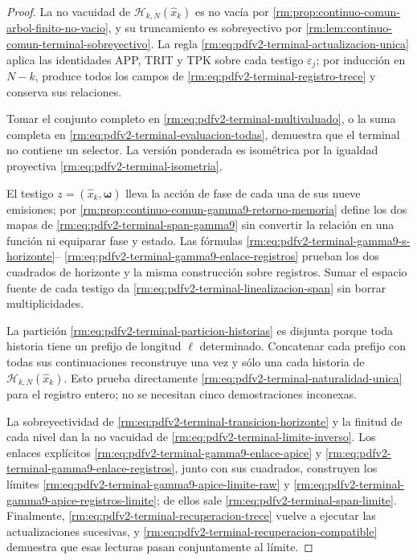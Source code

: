 \begin{proof}
La no vacuidad de
\(\mathscr H_{k,N}(\widehat x_k)\) es no vac\'ia por
\cref{rm:prop:continuo-comun-arbol-finito-no-vacio}, y su truncamiento es
sobreyectivo por \cref{rm:lem:continuo-comun-terminal-sobreyectivo}. La regla
\eqref{rm:eq:pdfv2-terminal-actualizacion-unica} aplica las identidades APP,
TRIT y TPK sobre cada testigo \(\varepsilon_j\); por inducci\'on en
\(N-k\), produce todos los campos de
\eqref{rm:eq:pdfv2-terminal-registro-trece} y conserva sus relaciones.

Tomar el conjunto completo en
\eqref{rm:eq:pdfv2-terminal-multivaluado}, o la suma completa en
\eqref{rm:eq:pdfv2-terminal-evaluacion-todas}, demuestra que el terminal no
contiene un selector. La versi\'on ponderada es isom\'etrica por la igualdad
proyectiva \eqref{rm:eq:pdfv2-terminal-isometria}.

El testigo \(z=(\widehat x_k,\boldsymbol\omega)\) lleva la acción de fase de cada una
de sus nueve emisiones; por
\cref{rm:prop:continuo-comun-gamma9-retorno-memoria} define los dos mapas de
\eqref{rm:eq:pdfv2-terminal-span-gamma9} sin convertir la relación en una
función ni equiparar fase y estado. Las fórmulas
\eqref{rm:eq:pdfv2-terminal-gamma9-s-horizonte}--
\eqref{rm:eq:pdfv2-terminal-gamma9-enlace-registros} prueban los dos cuadrados
de horizonte y la misma construcción sobre registros. Sumar el espacio
fuente de cada testigo da
\eqref{rm:eq:pdfv2-terminal-linealizacion-span} sin borrar multiplicidades.

La partici\'on
\eqref{rm:eq:pdfv2-terminal-particion-historias} es disjunta porque toda
historia tiene un prefijo de longitud \(\ell\) determinado. Concatenar cada
prefijo con todas sus continuaciones reconstruye una vez y s\'olo una cada
historia de \(\mathscr H_{k,N}(\widehat x_k)\). Esto prueba directamente
\eqref{rm:eq:pdfv2-terminal-naturalidad-unica} para el registro entero; no se
necesitan cinco demostraciones inconexas.

La sobreyectividad de
\eqref{rm:eq:pdfv2-terminal-transicion-horizonte} y la finitud de cada nivel
dan la no vacuidad de
\eqref{rm:eq:pdfv2-terminal-limite-inverso}. Los enlaces explícitos
\eqref{rm:eq:pdfv2-terminal-gamma9-enlace-apice} y
\eqref{rm:eq:pdfv2-terminal-gamma9-enlace-registros}, junto con sus cuadrados,
construyen los límites
\eqref{rm:eq:pdfv2-terminal-gamma9-apice-limite-raw} y
\eqref{rm:eq:pdfv2-terminal-gamma9-apice-registros-limite}; de ellos sale
\eqref{rm:eq:pdfv2-terminal-span-limite}. Finalmente,
\eqref{rm:eq:pdfv2-terminal-recuperacion-trece} vuelve a ejecutar las
actualizaciones sucesivas, y
\eqref{rm:eq:pdfv2-terminal-recuperacion-compatible} demuestra que esas
lecturas pasan conjuntamente al l\'imite.
\end{proof}

